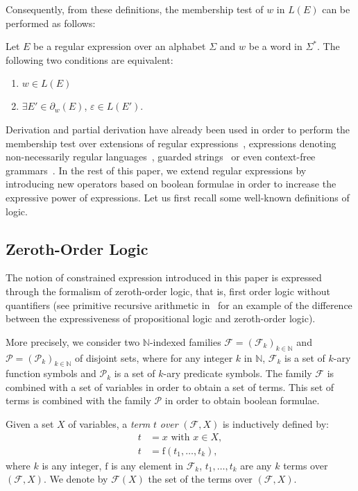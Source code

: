 \documentclass[a4paper]{llncs}
\begin{document}
  Consequently, from these definitions, the membership test of $w$ in $L(E)$ can be performed as follows:
  
  \begin{proposition}
    Let $E$ be a regular expression over an alphabet $\Sigma$ and $w$ be a word in $\Sigma^*$. The following two conditions are equivalent:
    \begin{enumerate}
      \item $w\in L(E)$
      \item $\exists E'\in \partial_w(E)$, $\varepsilon\in L(E')$.
    \end{enumerate}
  \end{proposition}
  
  Derivation and  partial derivation have already been used in order to perform the membership test over extensions of regular expressions~\cite{CCM11b,CCM12c,CCM14,CJM13}, expressions denoting non-necessarily regular languages~\cite{CDJM13}, guarded strings~\cite{ABM12} or even context-free grammars~\cite{MDS11}.  
  In the rest of this paper, 
we extend regular expressions by introducing new operators based on boolean formulae  
  in order to increase the expressive  power of expressions. 
Let us first recall some well-known definitions of logic.

  \subsection{Zeroth-Order Logic}
  
  The notion of constrained expression introduced in this paper is expressed through the formalism of zeroth-order logic, that is, first order logic without quantifiers (see primitive recursive arithmetic in~\cite{Sko67} for an example of the difference between the expressiveness of propositional logic and zeroth-order logic).
  
  More precisely, we consider two $\mathbb{N}$-indexed families $\mathcal{F}=(\mathcal{F}_k)_{k\in\mathbb{N}}$ and $\mathcal{P}=(\mathcal{P}_k)_{k\in\mathbb{N}}$ of disjoint sets, where for any integer $k$ in $\mathbb{N}$, $\mathcal{F}_k$ is a set of $k$-ary function symbols and $\mathcal{P}_k$ is a set of $k$-ary predicate symbols. The family $\mathcal{F}$  is combined with a set of variables in order to obtain a set of terms. This set of terms is combined with the family $\mathcal{P}$ in order to obtain boolean formulae.
  
  Given a set $X$ of variables, a \emph{term} $t$ \emph{over} $(\mathcal{F},X)$ is inductively defined by:
  \begin{align*}
        t & =x \text{ with } x\in X,\\
        t & =\mathrm{f}(t_1,\ldots,t_k),
  \end{align*}
  where $k$ is any integer, $\mathrm{f}$ is any element in $\mathcal{F}_k$, $t_1,\ldots,t_k$ are any $k$ terms over $(\mathcal{F},X)$. 
    We denote by $\mathcal{F}(X)$ the set of the terms over $(\mathcal{F},X)$.
    
\end{document}
